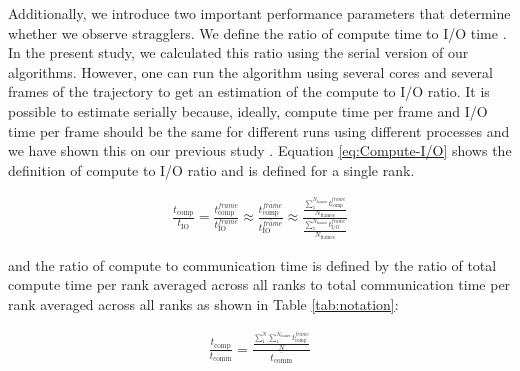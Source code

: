 Additionally, we introduce two important performance parameters that determine whether we observe stragglers.
We define the ratio of compute time to I/O time . 
In the present study, we calculated this ratio using the serial version of our algorithms.
However, one can run the algorithm using several cores and several frames of the trajectory to get an estimation of the compute to I/O ratio. 
It is possible to estimate  serially because, ideally, compute time per frame and I/O time per frame should be the same for different runs using different processes and we have shown this on our previous study \cite{Khoshlessan:2017ab}. Equation \ref{eq:Compute-I/O} shows the definition of compute to I/O ratio and is defined for a single rank.
 

\begin{gather}
  \label{eq:Compute-I/O}
    \frac{t_{\text{comp}}}{t_{\text{IO}}}=\frac{t_{\text{comp}}^{frame}}{t_{\text{IO}}^{frame}} \approx \frac{\overline{t_{\text{comp}}^{frame}}}{\overline{t_{\text{IO}}^{frame}}} \approx \frac{\frac{\sum_{1}^{N_{\text{frames}}}t_{\text{comp}}^{frame}}{N_{\text{frames}}}}{\frac{\sum_{1}^{N_{\text{frames}}}t_{\text{I/O}}^{frame}}{N_{\text{frames}}}} 
 \end{gather}

and the ratio of compute to communication time is defined by the ratio of total compute time per rank averaged across all ranks to total communication time per rank averaged across all ranks as shown in Table \ref{tab:notation}:

\begin{gather}
  \label{eq:Compute-comm}
       \frac{t_{\text{comp}}}{t_{\text{comm}}}= \frac{\frac{\sum_{1}^{N}\sum_{1}^{N_{\text{frames}}}t_{\text{comp}}^{frame}}{N}}{\overline{t_{\text{comm}}}}  
 \end{gather}
 
